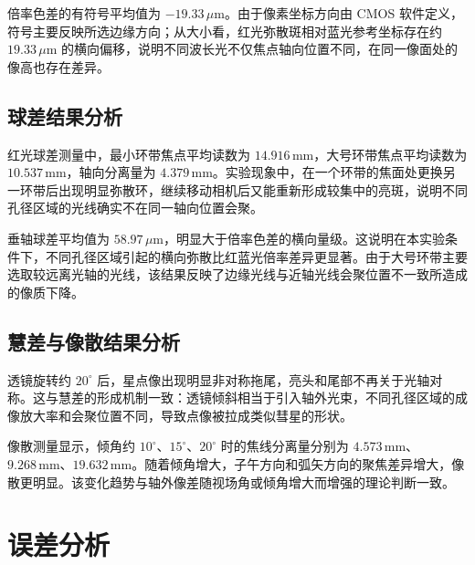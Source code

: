 \documentclass[12pt,a4paper]{article}
\begin{document}
倍率色差的有符号平均值为 $-19.33\,\mu\mathrm{m}$。由于像素坐标方向由 CMOS 软件定义，符号主要反映所选边缘方向；从大小看，红光弥散斑相对蓝光参考坐标存在约 $19.33\,\mu\mathrm{m}$ 的横向偏移，说明不同波长光不仅焦点轴向位置不同，在同一像面处的像高也存在差异。

\subsection{球差结果分析}

红光球差测量中，最小环带焦点平均读数为 $14.916\,\mathrm{mm}$，大号环带焦点平均读数为 $10.537\,\mathrm{mm}$，轴向分离量为 $4.379\,\mathrm{mm}$。实验现象中，在一个环带的焦面处更换另一环带后出现明显弥散环，继续移动相机后又能重新形成较集中的亮斑，说明不同孔径区域的光线确实不在同一轴向位置会聚。

垂轴球差平均值为 $58.97\,\mu\mathrm{m}$，明显大于倍率色差的横向量级。这说明在本实验条件下，不同孔径区域引起的横向弥散比红蓝光倍率差异更显著。由于大号环带主要选取较远离光轴的光线，该结果反映了边缘光线与近轴光线会聚位置不一致所造成的像质下降。

\subsection{慧差与像散结果分析}

透镜旋转约 $20^\circ$ 后，星点像出现明显非对称拖尾，亮头和尾部不再关于光轴对称。这与慧差的形成机制一致：透镜倾斜相当于引入轴外光束，不同孔径区域的成像放大率和会聚位置不同，导致点像被拉成类似彗星的形状。

像散测量显示，倾角约 $10^\circ$、$15^\circ$、$20^\circ$ 时的焦线分离量分别为 $4.573\,\mathrm{mm}$、$9.268\,\mathrm{mm}$、$19.632\,\mathrm{mm}$。随着倾角增大，子午方向和弧矢方向的聚焦差异增大，像散更明显。该变化趋势与轴外像差随视场角或倾角增大而增强的理论判断一致。

\section{误差分析}
\end{document}

